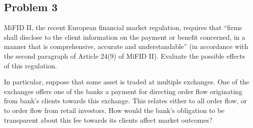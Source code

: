 \documentclass[11pt
, answers
]{exam}
\begin{document}
\quad
\subsection*{Problem 3}

MiFID II, the recent European financial market regulation, requires that ``firms shall disclose to the client information on the payment or benefit concerned, in a manner that is comprehensive, accurate and understandable'' (in accordance with the second paragraph of Article 24(9) of MiFID II). Evaluate the possible effects of this regulation.

In particular, suppose that some asset is traded at multiple exchanges. One of the exchanges offers one of the banks a payment for directing order flow originating from bank's clients towards this exchange. This relates either to all order flow, or to order flow from retail investors. How would the bank's obligation to be transparent about this fee towards its clients affect market outcomes?

\end{document}
